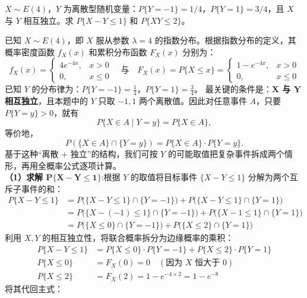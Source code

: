 ﻿\documentclass[lang=cn,11pt]{elegantbook}
\begin{document}
\begin{exercise}[混合型：连续+离散] \label{exer:3-c13}
$X \sim E(4)$，$Y$ 为离散型随机变量：$P\{Y=-1\} = 1/4$，$P\{Y=1\} = 3/4$，且 $X$ 与 $Y$ 相互独立。求 $P\{X-Y \leqslant 1\}$ 和 $P\{XY \leqslant 2\}$。
\end{exercise}
\begin{solution}
已知 $X \sim E(4)$，即 $X$ 服从参数 $\lambda = 4$ 的指数分布。根据指数分布的定义，其概率密度函数 $f_X(x)$ 和累积分布函数 $F_X(x)$ 分别为：
\[
f_X(x) = \begin{cases} 4e^{-4x}, & x > 0 \\ 0, & x \leqslant 0 \end{cases}
\quad \text{与} \quad
F_X(x) = P\{X \leqslant x\} = \begin{cases} 1 - e^{-4x}, & x > 0 \\ 0, & x \leqslant 0 \end{cases}
\]
已知 $Y$ 的分布律为：$P\{Y=-1\} = \frac{1}{4}$，$P\{Y=1\} = \frac{3}{4}$。
最关键的条件是：\textbf{$\boldsymbol{X}$ 与 $\boldsymbol{Y}$ 相互独立}，且本题中的 \(Y\) 只取 \(-1,1\) 两个离散值。因此对任意事件 \(A\)，只要 \(P\{Y=y\}>0\)，就有
\[
P\{X\in A\mid Y=y\}=P\{X\in A\},
\]
等价地，
\[
P(\{X\in A\}\cap\{Y=y\})=P\{X\in A\}\cdot P\{Y=y\}.
\]
基于这种“离散 + 独立”的结构，我们可按 \(Y\) 的可能取值把复杂事件拆成两个情形，再用全概率公式逐项计算。\\
\textbf{（1）求解 $\boldsymbol{P\{X-Y \leqslant 1\}}$}:根据 $Y$ 的取值将目标事件 $\{X-Y \leqslant 1\}$ 分解为两个互斥子事件的和：
\begin{align*}
P\{X-Y \leqslant 1\} &= P\big( \{X-Y \leqslant 1\} \cap \{Y=-1\} \big) + P\big( \{X-Y \leqslant 1\} \cap \{Y=1\} \big) \\
&= P\big( \{X-(-1) \leqslant 1\} \cap \{Y=-1\} \big) + P\big( \{X-1 \leqslant 1\} \cap \{Y=1\} \big) \\
&= P\big( \{X \leqslant 0\} \cap \{Y=-1\} \big) + P\big( \{X \leqslant 2\} \cap \{Y=1\} \big)
\end{align*}
利用 $X, Y$ 的相互独立性，将联合概率拆分为边缘概率的乘积：
\begin{align*}
P\{X-Y \leqslant 1\} &= P\{X \leqslant 0\} \cdot P\{Y=-1\} + P\{X \leqslant 2\} \cdot P\{Y=1\}\\
P\{X \leqslant 0\} &= F_X(0) = 0 \quad (\text{因为 } X \text{ 恒大于 } 0) \\
P\{X \leqslant 2\} &= F_X(2) = 1 - e^{-4 \times 2} = 1 - e^{-8}
\end{align*}
将其代回主式：
\begin{align*}

\end{align*}
\end{solution}
\end{document}
